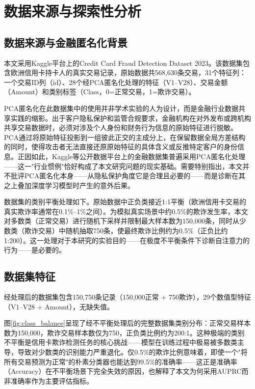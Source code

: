 
\section{数据来源与探索性分析}
\label{sec:data}

\subsection{数据来源与金融匿名化背景}

本文采用Kaggle平台上的Credit Card Fraud Detection Dataset 2023\cite{kaggle2023fraud}。该数据集包含欧洲信用卡持卡人的真实交易记录，原始数据共568,630条交易，31个特征列：一个交易ID列（id）、28个经PCA匿名化处理的特征（V1--V28）、交易金额（Amount）和类别标签（Class，0=正常交易，1=欺诈交易）。

PCA匿名化在此数据集中的使用并非学术实验的人为设计，而是金融行业数据共享实践的缩影。出于客户隐私保护和监管合规要求，金融机构在对外发布或跨机构共享交易数据时，必须对涉及个人身份和财务行为信息的原始特征进行脱敏。PCA通过将原始特征投影到一组彼此正交的主成分上，在保留数据全局方差结构的同时，使得攻击者无法直接还原原始特征的具体含义或反推特定客户的身份信息。正因如此，Kaggle等公开数据平台上的金融数据集普遍采用PCA匿名化处理——这一"行业惯例"恰好构成了本文研究问题的现实基础。需要特别指出，本文并不批评PCA匿名化本身——从隐私保护角度它是合理且必要的——而是诊断在其之上叠加深度学习模型时产生的意外后果。

数据集的类别平衡处理如下。原始数据中正负类接近1:1平衡（欧洲信用卡交易的真实欺诈率通常在0.1\%--1\%之间）。为模拟真实场景中约0.5\%的欺诈发生率，本文对多数类（正常交易）进行随机下采样并限制最大样本数为150,000条，同时从少数类（欺诈交易）中随机抽取750条，使最终欺诈比例约为0.5\%（正负比约1:200）。这一处理对于本研究的实验目的——在极度不平衡条件下诊断自注意力的行为——是必要的。

\subsection{数据集特征}

经处理后的数据集包含150,750条记录（150,000正常 + 750欺诈），29个数值型特征（V1--V28 + Amount），无缺失值。

图\ref{fig:class_balance}呈现了经不平衡处理后的完整数据集类别分布：正常交易样本数为150,000，欺诈交易样本数仅为750，正负类比例约为200:1。这种极端的类别不平衡是信用卡欺诈检测任务的核心挑战——模型在训练过程中极易被多数类主导，导致对少数类的识别能力严重退化。仅0.5\%的欺诈比例意味着，即使一个"将所有交易预测为正常"的朴素分类器也能达到99.5\%的准确率——这正是准确率（Accuracy）在不平衡场景下完全失效的原因，也解释了本文为何采用AUPRC而非准确率作为主要评估指标。

